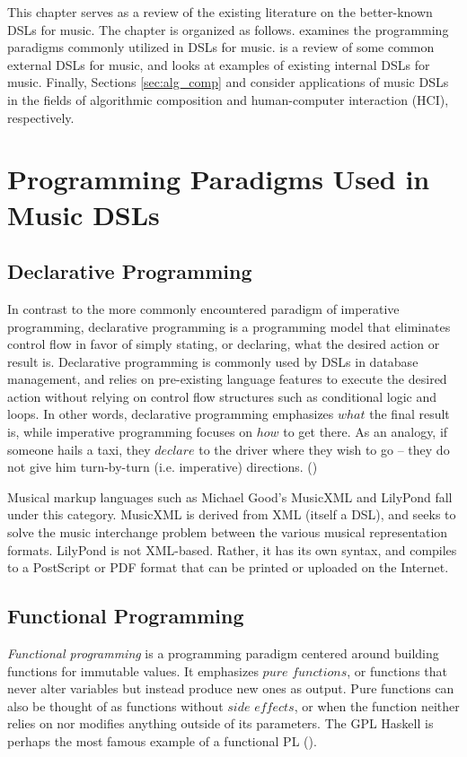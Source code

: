 \documentclass{report}
\newcommand\citeparen[1]{(\cite{#1})}
\begin{document}
This chapter serves as a review of the existing literature on the better-known DSLs for music. The chapter is organized as follows.  examines the programming paradigms commonly utilized in  DSLs for music.  is a review of some common external DSLs for music, and  looks at examples of existing internal  DSLs for music. Finally, Sections \ref{sec:alg_comp} and  consider applications of  music DSLs in the fields of algorithmic composition and human-computer  interaction (HCI), respectively.

\section{Programming Paradigms Used  in Music  DSLs}
\label{sec:prog_paradigms}

\subsection{Declarative Programming}
In contrast to the more commonly encountered paradigm of imperative programming, declarative programming is a programming model that eliminates control flow in favor of simply stating, or declaring, what the desired action or result is. Declarative programming is commonly used by DSLs in database management, and relies on pre-existing language features to execute the desired action without relying on control flow structures such as conditional logic and loops. In other words, declarative programming emphasizes $what$ the final result is, while imperative programming focuses on $how$ to get there. As an analogy, if someone hails a taxi, they $declare$ to the driver where they wish to go -- they do not give him turn-by-turn (i.e. imperative) directions. \citeparen{bertram_2021}

Musical markup languages such as Michael Good's MusicXML and LilyPond fall under this category. MusicXML is derived from XML (itself a DSL), and seeks to solve the music interchange problem between the various musical representation formats.  \cite{good_2013} LilyPond is not XML-based. Rather, it has its own syntax, and compiles to a PostScript or PDF format that can be printed or uploaded on the Internet.

\subsection{Functional Programming}
\textit{Functional programming} is a programming paradigm centered around  building functions for immutable values. It emphasizes $pure$ $functions$, or functions that never alter variables  but instead produce new  ones as output. Pure functions  can also be thought of as functions without $side$ $effects$, or when the function neither relies on nor modifies anything outside of its parameters. The GPL Haskell is perhaps the most famous example of a functional PL \citeparen{joury_2020}.
\end{document}
